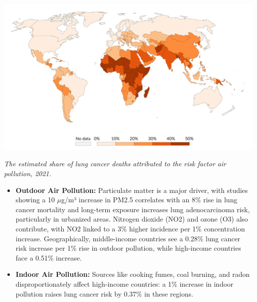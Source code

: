 \vspace{1em}
\begin{center} 
    \includegraphics[width=\textwidth]{../assets/02-etiology/share-of-lung-cancer-deaths-attributed-to-air-pollution.png}

    \small\textit{The estimated share of lung cancer deaths attributed to the risk factor air 
    pollution, 2021. \cite{ihme2016}}
\end{center}
\vspace{1em} 

\begin{itemize}
    \item \textbf{Outdoor Air Pollution:} Particulate matter is a major driver, with studies showing 
    a 10 $\mu$g/m³ increase in PM2.5 correlates with an 8\% rise in lung cancer mortality \cite{38513187} 
    and long-term exposure increases lung adenocarcinoma risk, particularly in urbanized areas. 
    Nitrogen dioxide (NO2) and ozone (O3) also contribute, with NO2 linked to a 3\% higher incidence 
    per 1\% concentration increase. Geographically, middle-income countries see a 0.28\% lung cancer 
    risk increase per 1\% rise in outdoor pollution, while high-income countries face a 0.51\% 
    increase. \cite{jco2023}

    \item \textbf{Indoor Air Pollution:} Sources like cooking fumes, coal burning, and radon 
    disproportionately affect high-income countries: a 1\% increase in indoor pollution raises lung 
    cancer risk by 0.37\% in these regions. \cite{fpubh.2024.1372320}
\end{itemize}

